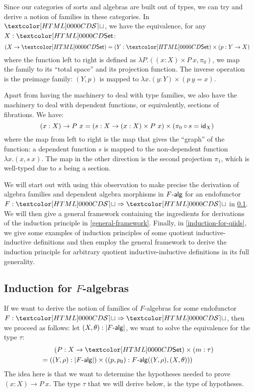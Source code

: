 Since our categories of sorts and algebras are built out of types, we
can try and derive a notion of families in these categories. In
$\SET$, we have the equivalence, for any $X : \Set$:
$$
(X \to \Set) = (Y : \Set) \times (p : Y \to X)
$$
where the function left to right is defined as
$\lambda P . ((x : X) \times P\ x , \pi_0)$, \ie we map the family to
its ``total space'' and its projection function. The inverse operation
is the preimage family: $(Y,p)$ is mapped to
$\lambda x . (y : Y) \times (p\ y = x)$. 

Apart from having the machinery to deal with type families, we also
have the machinery to deal with dependent functions, or equivalently,
sections of fibrations. We have:
$$
(x : X) \to P\ x = (s : X \to (x : X) \times P\ x) \times (\pi_0 \circ s = \id_{X})
$$
where the map from left to right is the map that gives the ``graph''
of the function: a dependent function $s$ is mapped to the
non-dependent function $\lambda x . (x , s\ x)$. The map in the other
direction is the second projection $\pi_1$, which is well-typed due to
$s$ being a section.

We will start out with using this observation to make precise the
derivation of algebra families and dependent algebra morphisms in
$\algcat{F}$ for an endofunctor $F : \Func{\SET}{\SET}$ in
\cref{induction-for-f-algebras}. We will then give a general framework
containing the ingredients for derivations of the induction principle
in \cref{general-framework}. Finally, in \cref{induction-for-qiids},
we give some examples of induction principles of some quotient
inductive-inductive definitions and then employ the general framework
to derive the induction principle for arbitrary quotient
inductive-inductive definitions in its full generality.

\subsection{Induction for $F$-algebras}
\label{induction-for-f-algebras}
If we want to derive the notion of families of $F$-algebras for some
endofunctor $F : \Func{\SET}{\SET}$, then we proceed as follows: let
$(X,\theta) : | \algcat{F} |$, we want to solve the equivalence for
the type $\tau$:
%
\begin{align*}
&\ \ \ \ \ \ (P : X \to \Set) \times (m : \tau) \\
&= ((Y,\rho) : | \algcat{F} |) \times ((p,p_0) : \algcat{F}((Y,\rho),(X,\theta)))  
\end{align*}
%
The idea here is that we want to determine the hypotheses needed to
prove $(x : X) \to P\ x$. The type $\tau$ that we will derive below,
is the type of hypotheses.

